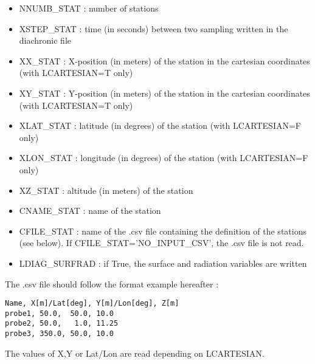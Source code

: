 \begin{itemize}
\item NNUMB\_STAT : number of stations

\item XSTEP\_STAT : time (in seconds) between two sampling written in the diachronic file

\item XX\_STAT : X-position (in meters) of the station in the cartesian coordinates (with LCARTESIAN=T only)

\item XY\_STAT : Y-position (in meters) of the station in the cartesian coordinates (with LCARTESIAN=T only)

\item XLAT\_STAT : latitude (in degrees) of the station (with LCARTESIAN=F only)

\item XLON\_STAT : longitude (in degrees) of the station (with LCARTESIAN=F only)

\item XZ\_STAT : altitude (in meters) of the station

\item CNAME\_STAT : name of the station

\item CFILE\_STAT : name of the .csv file containing the definition of the stations (see below). If CFILE\_STAT='NO\_INPUT\_CSV', the .csv file is not read.

\item LDIAG\_SURFRAD : if True, the surface and radiation variables are written

\end{itemize}

The .csv file should follow the format example hereafter :
\begin{verbatim}
Name, X[m]/Lat[deg], Y[m]/Lon[deg], Z[m]
probe1, 50.0,  50.0, 10.0
probe2, 50.0,   1.0, 11.25
probe3, 350.0, 50.0, 10.0
\end{verbatim}
The values of X,Y or Lat/Lon are read depending on LCARTESIAN.

